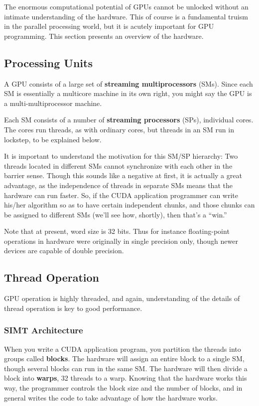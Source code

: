 The enormous computational potential of GPUs cannot be unlocked without
an intimate understanding of the hardware.  This of course is a 
fundamental truism in the parallel processing world, but it is acutely
important for GPU programming.  This section presents an overview of the
hardware. 

\subsection{Processing Units}

A GPU consists of a large set of {\bf streaming multiprocessors} (SMs).
Since each SM is essentially a multicore machine in its own right, you
might say the GPU is a multi-multiprocessor machine.  

Each SM consists of a number of {\bf streaming processors} (SPs),
individual cores.  The cores run threads, as with ordinary cores, but
threads in an SM run in lockstep, to be explained below.

It is important to understand the motivation for this SM/SP hierarchy:
Two threads located in different SMs cannot synchronize with each other
in the barrier sense.  Though this sounds like a negative at first, it
is actually a great advantage, as the independence of threads in
separate SMs means that the hardware can run faster.  So, if the CUDA
application programmer can write his/her algorithm so as to have certain
independent chunks, and those chunks can be assigned to different SMs
(we'll see how, shortly), then that's a ``win.''

Note that at present, word size is 32 bits.  Thus for instance
floating-point operations in hardware were originally in single precision
only, though newer devices are capable of double precision.

\subsection{Thread Operation}

GPU operation is highly threaded, and again, understanding of the
details of thread operation is key to good performance.

\subsubsection{SIMT Architecture}

When you write a CUDA application program, you partition the threads
into groups called {\bf blocks}.  The hardware will assign an entire
block to a single SM, though several blocks can run in the same SM.  The
hardware will then divide a block into {\bf warps}, 32 threads to a
warp.  Knowing that the hardware works this way, the programmer controls
the block size and the number of blocks, and in general writes the code
to take advantage of how the hardware works.  

